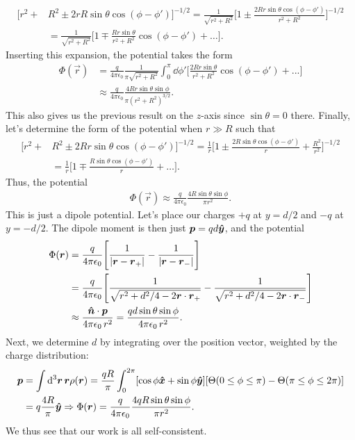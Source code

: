 {\begin{align}
    \Big[ r^2 + &R^2 \pm 2 r R \sin{\theta} \cos(\phi - \phi') \Big]^{-1/2} = \frac{1}{\sqrt{r^2 + R^2}} \Bigg[ 1 \pm \frac{2R r \sin{\theta} \cos(\phi - \phi')}{r^2 + R^2} \Bigg]^{-1/2} \nonumber \\
    &= \frac{1}{\sqrt{r^2 + R^2}} \Bigg[ 1 \mp \frac{R r \sin{\theta}}{r^2 + R^2} \cos(\phi - \phi') + \hdots \Bigg]
.\end{align}
Inserting this expansion, the potential takes the form
\begin{align}
    \Phi(\vec{r}) &= \frac{q}{4 \pi \epsilon_0} \frac{1}{\pi \sqrt{r^2 + R^2}} \int_0^{\pi} \dd{\phi'} \Bigg[ \frac{2 R r \sin{\theta}}{r^2 + R^2} \cos(\phi - \phi') + ... \Bigg] \nonumber \\
    &\approx \frac{q}{4 \pi \epsilon_0} \frac{4 R r \sin{\theta} \sin{\phi}}{\pi (r^2 + R^2)^{3/2}}
.\end{align}
This also gives us the previous result on the $z$-axis since $\sin{\theta} = 0$ there.
Finally, let's determine the form of the potential when $r \gg R$ such that
\begin{align}
    \Big[ r^2 + &R^2 \pm 2 R r \sin{\theta} \cos(\phi - \phi') \Big]^{-1/2} = \frac{1}{r} \Bigg[ 1 \pm \frac{2 R \sin{\theta} \cos(\phi - \phi')}{r} + \frac{R^2}{r^2} \Bigg]^{-1/2} \nonumber \\
    &= \frac{1}{r} \Bigg[ 1 \mp \frac{R \sin{\theta} \cos(\phi - \phi')}{r} + \hdots \Bigg]
.\end{align}
Thus, the potential
\begin{align}
    \Phi(\vec{r}) \approx \frac{q}{4 \pi \epsilon_0} \frac{4 R \sin{\theta} \sin{\phi}}{\pi r^2}
.\end{align}
This is just a dipole potential.
Let's place our charges $+q$ at $y = d/2$ and $-q$ at $y = -d/2$.
The dipole moment is then just $\vb*{p} = q d \vu*{y}$, and the potential
\begin{align}
    \Phi(\vb*{r}) &= \frac{q}{4 \pi \epsilon_0} \Bigg[ \frac{1}{|\vb*{r} - \vb*{r}_+|} - \frac{1}{|\vb*{r} - \vb*{r}_-|} \Bigg] \nonumber \\
    &= \frac{q}{4 \pi \epsilon_0} \Bigg[ \frac{1}{\sqrt{r^2 + d^2/4 - 2 \vb*{r} \cdot \vb*{r}_+}} - \frac{1}{\sqrt{r^2 + d^2/4 - 2 \vb*{r} \cdot \vb*{r}_-}} \Bigg] \nonumber \\
    &\approx \frac{\vu*{n} \cdot \vb*{p}}{4 \pi \epsilon_0 \, r^2} = \frac{q d \sin{\theta} \sin{\phi}}{4 \pi \epsilon_0 \, r^2}
.\end{align}
Next, we determine $d$ by integrating over the position vector, weighted by the charge distribution:
\begin{align}
    \vb*{p} &= \int \dd[3]{\vb*{r}} \vb*{r} \rho(\vb*{r}) = \frac{q R}{\pi} \int_{0}^{2 \pi} [ \cos{\phi} \vu*{x} + \sin{\phi} \vu*{y} ] [ \Theta(0 \leq \phi \leq \pi) - \Theta(\pi \leq \phi \leq 2\pi) ] \nonumber \\
    &= q \frac{4 R}{\pi} \vu*{y} \Rightarrow \Phi(\vb*{r}) = \frac{q}{4 \pi \epsilon_0} \frac{4 q R \sin{\theta} \sin{\phi}}{\pi r^2}
.\end{align}
We thus see that our work is all self-consistent.

}
